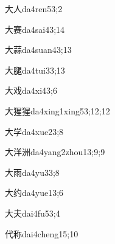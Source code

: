 \begin{verbete}{大人}{da4ren5}{3;2}
\end{verbete}

\begin{verbete}{大赛}{da4sai4}{3;14}
\end{verbete}

\begin{verbete}{大蒜}{da4suan4}{3;13}
\end{verbete}

\begin{verbete}{大腿}{da4tui3}{3;13}
\end{verbete}

\begin{verbete}{大戏}{da4xi4}{3;6}
\end{verbete}

\begin{verbete}{大猩猩}{da4xing1xing5}{3;12;12}
\end{verbete}

\begin{verbete}{大学}{da4xue2}{3;8}
\end{verbete}

\begin{verbete}{大洋洲}{da4yang2zhou1}{3;9;9}
\end{verbete}

\begin{verbete}{大雨}{da4yu3}{3;8}
\end{verbete}

\begin{verbete}{大约}{da4yue1}{3;6}
\end{verbete}

\begin{verbete}{大夫}{dai4fu5}{3;4}
\end{verbete}

\begin{verbete}{代称}{dai4cheng1}{5;10}
\end{verbete}

